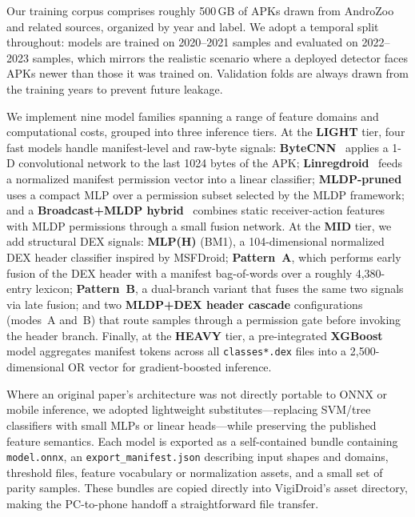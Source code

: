 Our training corpus comprises roughly 500\,GB of APKs drawn from AndroZoo and related sources, organized by year and label. We adopt a temporal split throughout: models are trained on 2020--2021 samples and evaluated on 2022--2023 samples, which mirrors the realistic scenario where a deployed detector faces APKs newer than those it was trained on. Validation folds are always drawn from the training years to prevent future leakage.
 
We implement nine model families spanning a range of feature domains and computational costs, grouped into three inference tiers. At the \textbf{LIGHT} tier, four fast models handle manifest-level and raw-byte signals: \textbf{ByteCNN}~\cite{byteCNN} applies a 1-D convolutional network to the last 1024 bytes of the APK; \textbf{Linregdroid}~\cite{linregdroid} feeds a normalized manifest permission vector into a linear classifier; \textbf{MLDP-pruned}~\cite{mldp} uses a compact MLP over a permission subset selected by the MLDP framework; and a \textbf{Broadcast+MLDP hybrid}~\cite{broadcast,mldp} combines static receiver-action features with MLDP permissions through a small fusion network. At the \textbf{MID} tier, we add structural DEX signals: \textbf{MLP(H)} (BM1), a 104-dimensional normalized DEX header classifier inspired by MSFDroid; \textbf{Pattern~A}, which performs early fusion of the DEX header with a manifest bag-of-words over a roughly 4,380-entry lexicon; \textbf{Pattern~B}, a dual-branch variant that fuses the same two signals via late fusion; and two \textbf{MLDP+DEX header cascade} configurations (modes~A and~B) that route samples through a permission gate before invoking the header branch. Finally, at the \textbf{HEAVY} tier, a pre-integrated \textbf{XGBoost} model aggregates manifest tokens across all \texttt{classes*.dex} files into a 2,500-dimensional OR vector for gradient-boosted inference.
 
Where an original paper's architecture was not directly portable to ONNX or mobile inference, we adopted lightweight substitutes---replacing SVM/tree classifiers with small MLPs or linear heads---while preserving the published feature semantics. Each model is exported as a self-contained bundle containing \texttt{model.onnx}, an \texttt{export\_manifest.json} describing input shapes and domains, threshold files, feature vocabulary or normalization assets, and a small set of parity samples. These bundles are copied directly into VigiDroid's asset directory, making the PC-to-phone handoff a straightforward file transfer.
 
